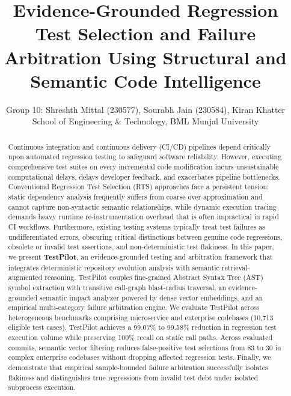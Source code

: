 \documentclass[12pt,onecolumn,draftclsnofoot]{IEEEtran}
\begin{document}
\title{Evidence-Grounded Regression Test Selection and Failure Arbitration Using Structural and Semantic Code Intelligence}

\author{
Group 10: Shreshth Mittal (230577), Sourabh Jain (230584), Kiran Khatter\\
School of Engineering \& Technology, BML Munjal University
}

\maketitle

\begin{abstract}
Continuous integration and continuous delivery (CI/CD) pipelines depend critically upon automated regression testing to safeguard software reliability. However, executing comprehensive test suites on every incremental code modification incurs unsustainable computational delays, delays developer feedback, and exacerbates pipeline bottlenecks. Conventional Regression Test Selection (RTS) approaches face a persistent tension: static dependency analysis frequently suffers from coarse over-approximation and cannot capture non-syntactic semantic relationships, while dynamic execution tracing demands heavy runtime re-instrumentation overhead that is often impractical in rapid CI workflows. Furthermore, existing testing systems typically treat test failures as undifferentiated errors, obscuring critical distinctions between genuine code regressions, obsolete or invalid test assertions, and non-deterministic test flakiness. In this paper, we present \textbf{TestPilot}, an evidence-grounded testing and arbitration framework that integrates deterministic repository evolution analysis with semantic retrieval-augmented reasoning. TestPilot couples fine-grained Abstract Syntax Tree (AST) symbol extraction with transitive call-graph blast-radius traversal, an evidence-grounded semantic impact analyzer powered by dense vector embeddings, and an empirical multi-category failure arbitration engine. We evaluate TestPilot across heterogeneous benchmarks comprising microservice and enterprise codebases (10,713 eligible test cases). TestPilot achieves a 99.07\% to 99.58\% reduction in regression test execution volume while preserving 100\% recall on static call paths. Across evaluated commits, semantic vector filtering reduces false-positive test selections from 83 to 30 in complex enterprise codebases without dropping affected regression tests. Finally, we demonstrate that empirical sample-bounded failure arbitration successfully isolates flakiness and distinguishes true regressions from invalid test debt under isolated subprocess execution.
\end{abstract}
\end{document}
